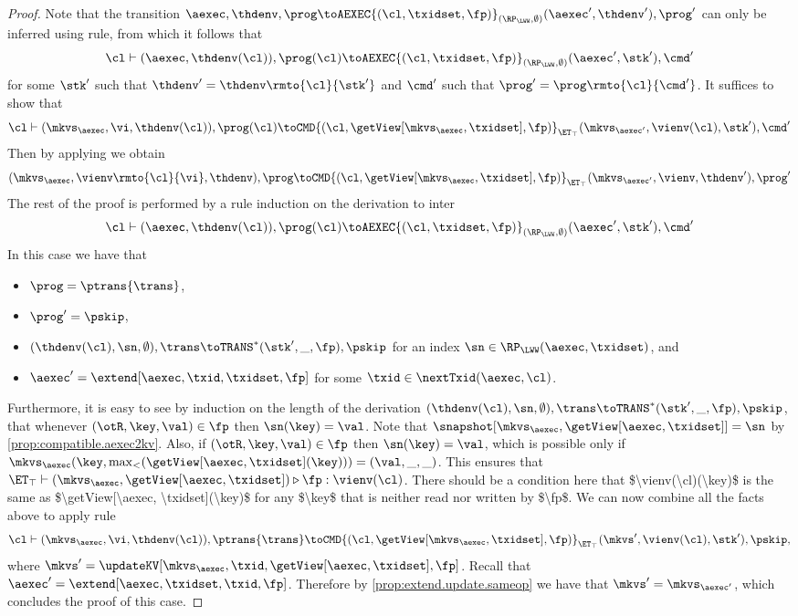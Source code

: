 \begin{proof}
Note that the transition 
$\aexec, \thdenv, \prog \toAEXEC{(\cl, \txidset, \fp)}_{(\RP_{\LWW}, \emptyset)} (\aexec', \thdenv'), \prog'$ 
can only be inferred using  rule, 
from which it follows that 
\[
    \cl \vdash (\aexec, \thdenv(\cl)), \prog(\cl) 
    \toAEXEC{(\cl, \txidset, \fp)}_{(\RP_{\LWW}, \emptyset)} (\aexec' ,\stk'), \cmd'
\]
for some $\stk'$ such that $\thdenv' = \thdenv\rmto{\cl}{\stk'}$ 
and $\cmd'$ such that $\prog' = \prog\rmto{\cl}{\cmd'}$.
It suffices to show that 
\[
    \cl \vdash (\mkvs_\aexec, \vi, \thdenv(\cl)), \prog(\cl) 
   \toCMD{(\cl, \getView[\mkvs_{\aexec}, \txidset], \fp)}_{\ET_{\top}} 
    (\mkvs_{\aexec'}, \vienv(\cl), \stk'), \cmd'
\]
Then by applying  we obtain 
\[
    (\mkvs_{\aexec}, \vienv\rmto{\cl}{\vi}, \thdenv), \prog 
    \toCMD{(\cl, \getView[\mkvs_{\aexec}, \txidset], \fp)}_{\ET_{\top}} 
    (\mkvs_{\aexec'}, \vienv, \thdenv'), \prog'
\]
The rest of the proof is performed by a rule induction on the derivation to inter 
\[ 
    \cl \vdash (\aexec, \thdenv(\cl)), \prog(\cl) 
    \toAEXEC{(\cl, \txidset, \fp)}_{(\RP_{\LWW}, \emptyset)} (\aexec', \stk'), \cmd'
\]
In this case we have that 
\begin{itemize}
    \item $\prog = \ptrans{\trans}$, 
    \item $\prog' = \pskip$, 
    \item $(\thdenv(\cl), \sn, \emptyset), \trans \toTRANS^{\ast} (\stk', \_, \fp), \pskip$ for an index $\sn \in \RP_{\LWW}(\aexec, \txidset)$, and 
    \item $\aexec' = \extend[\aexec, \txid, \txidset, \fp]$ for some $\txid \in \nextTxid(\aexec, \cl)$. 
\end{itemize}
Furthermore, it is easy to see by induction on the length of the derivation 
$(\thdenv(\cl), \sn, \emptyset), \trans \toTRANS^{\ast} (\stk', \_, \fp), \pskip$, 
that whenever $(\otR, \key, \val) \in \fp$ then $\sn(\key) = \val$.
Note that $\snapshot[\mkvs_{\aexec}, \getView[\aexec, \txidset]] = \sn$ by \cref{prop:compatible.aexec2kv}.
Also, if $(\otR,\key, \val) \in \fp$ then $\sn(\key) = \val$, which is possible only if  
$\mkvs_{\aexec}(\key, \max_{<}(\getView[\aexec, \txidset](\key))) = (\val, \_, \_)$.
This ensures that $\ET_{\top} \vdash (\mkvs_{\aexec}, \getView[\aexec, \txidset]) \triangleright \fp: \vienv(\cl)$. 
\ac{There should be a condition here that $\vienv(\cl)(\key)$ is the same as $\getView[\aexec, \txidset](\key)$ 
for any $\key$ that is neither read nor written by $\fp$.} 
We can now combine all the facts above to apply rule 
\[
    \cl \vdash (\mkvs_{\aexec}, \vi, \thdenv(\cl)), \ptrans{\trans}
    \toCMD{(\cl, \getView[\mkvs_{\aexec}, \txidset], \fp)}_{\ET_{\top}} 
    (\mkvs', \vienv(\cl), \stk'), \pskip, 
\] 
where $\mkvs' = \updateKV[\mkvs_{\aexec}, \txid, \getView[\aexec, \txidset], \fp]$. 
Recall that $\aexec' = \extend[\aexec, \txidset, \txid, \fp]$. 
Therefore by \cref{prop:extend.update.sameop} we have that $\mkvs' = \mkvs_{\aexec'}$, 
which concludes the proof of this case.


\end{proof}
